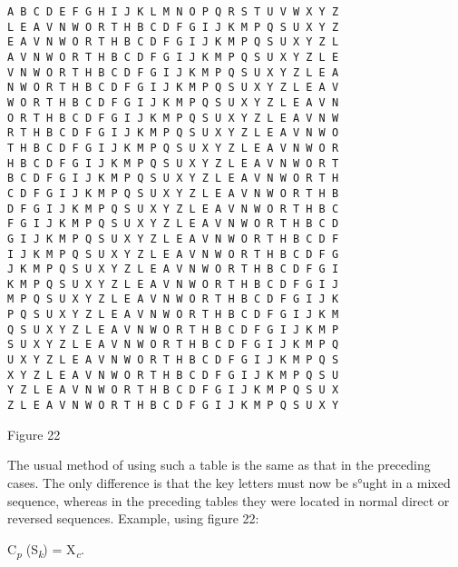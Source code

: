 \begin{textfigure}
        \begin{verbatim}
A B C D E F G H I J K L M N O P Q R S T U V W X Y Z
L E A V N W O R T H B C D F G I J K M P Q S U X Y Z
E A V N W O R T H B C D F G I J K M P Q S U X Y Z L
A V N W O R T H B C D F G I J K M P Q S U X Y Z L E
V N W O R T H B C D F G I J K M P Q S U X Y Z L E A
N W O R T H B C D F G I J K M P Q S U X Y Z L E A V
W O R T H B C D F G I J K M P Q S U X Y Z L E A V N
O R T H B C D F G I J K M P Q S U X Y Z L E A V N W
R T H B C D F G I J K M P Q S U X Y Z L E A V N W O
T H B C D F G I J K M P Q S U X Y Z L E A V N W O R
H B C D F G I J K M P Q S U X Y Z L E A V N W O R T
B C D F G I J K M P Q S U X Y Z L E A V N W O R T H
C D F G I J K M P Q S U X Y Z L E A V N W O R T H B
D F G I J K M P Q S U X Y Z L E A V N W O R T H B C
F G I J K M P Q S U X Y Z L E A V N W O R T H B C D
G I J K M P Q S U X Y Z L E A V N W O R T H B C D F
I J K M P Q S U X Y Z L E A V N W O R T H B C D F G
J K M P Q S U X Y Z L E A V N W O R T H B C D F G I
K M P Q S U X Y Z L E A V N W O R T H B C D F G I J
M P Q S U X Y Z L E A V N W O R T H B C D F G I J K
P Q S U X Y Z L E A V N W O R T H B C D F G I J K M
Q S U X Y Z L E A V N W O R T H B C D F G I J K M P
S U X Y Z L E A V N W O R T H B C D F G I J K M P Q
U X Y Z L E A V N W O R T H B C D F G I J K M P Q S
X Y Z L E A V N W O R T H B C D F G I J K M P Q S U
Y Z L E A V N W O R T H B C D F G I J K M P Q S U X
Z L E A V N W O R T H B C D F G I J K M P Q S U X Y
        \end{verbatim}
        \caption{Figure 22}
\end{textfigure}

The usual method of using such a table is the same as that in the preceding cases. The only difference is that the key letters must now be
s°ught in a mixed sequence, whereas in the preceding tables they were
located in normal direct or reversed sequences. Example, using figure 22:

C\textsubscript{\textit{p}} (S\textsubscript{\textit{k}}) = X\textsubscript{\textit{c}}.

